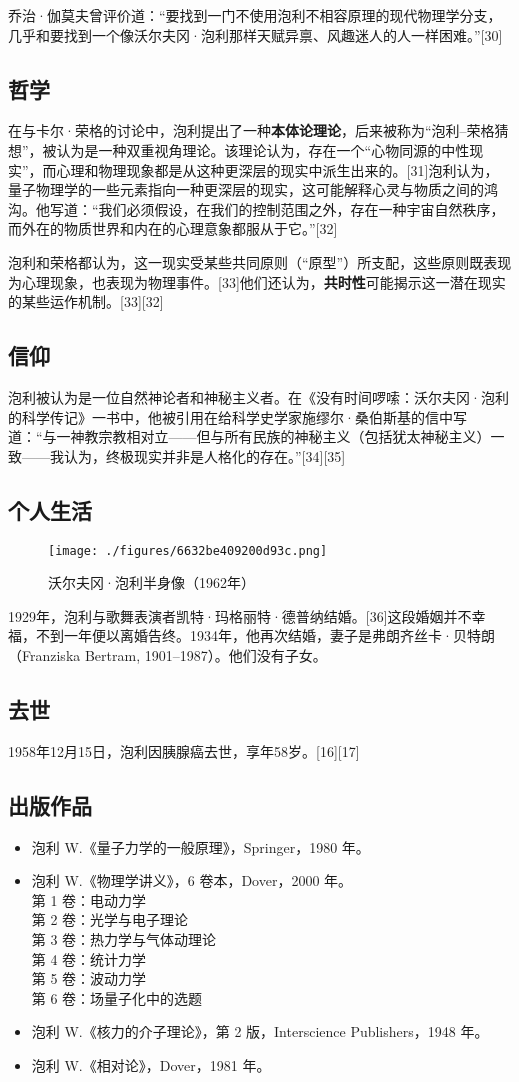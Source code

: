 乔治·伽莫夫曾评价道：“要找到一门不使用泡利不相容原理的现代物理学分支，几乎和要找到一个像沃尔夫冈·泡利那样天赋异禀、风趣迷人的人一样困难。”[30]
\subsection{哲学}  
在与卡尔·荣格的讨论中，泡利提出了一种\textbf{本体论理论}，后来被称为“泡利–荣格猜想”，被认为是一种双重视角理论。该理论认为，存在一个“心物同源的中性现实”，而心理和物理现象都是从这种更深层的现实中派生出来的。[31]泡利认为，量子物理学的一些元素指向一种更深层的现实，这可能解释心灵与物质之间的鸿沟。他写道：“我们必须假设，在我们的控制范围之外，存在一种宇宙自然秩序，而外在的物质世界和内在的心理意象都服从于它。”[32]  

泡利和荣格都认为，这一现实受某些共同原则（“原型”）所支配，这些原则既表现为心理现象，也表现为物理事件。[33]他们还认为，\textbf{共时性}可能揭示这一潜在现实的某些运作机制。[33][32]  
\subsection{信仰} 
泡利被认为是一位自然神论者和神秘主义者。在《没有时间啰嗦：沃尔夫冈·泡利的科学传记》一书中，他被引用在给科学史学家施缪尔·桑伯斯基的信中写道：“与一神教宗教相对立——但与所有民族的神秘主义（包括犹太神秘主义）一致——我认为，终极现实并非是人格化的存在。”[34][35]
\subsection{个人生活}
\begin{figure}[ht]
\centering
\texttt{[image: ./figures/6632be409200d93c.png]}
\caption{沃尔夫冈·泡利半身像（1962年）} \label{fig_Pauli2_5}
\end{figure}
1929年，泡利与歌舞表演者凯特·玛格丽特·德普纳结婚。[36]这段婚姻并不幸福，不到一年便以离婚告终。1934年，他再次结婚，妻子是弗朗齐丝卡·贝特朗（Franziska Bertram, 1901–1987）。他们没有子女。  
\subsection{去世}  
1958年12月15日，泡利因胰腺癌去世，享年58岁。[16][17]
\subsection{出版作品}  
\begin{itemize}
\item 泡利 W.《量子力学的一般原理》，Springer，1980 年。  
\item 泡利 W.《物理学讲义》，6 卷本，Dover，2000 年。\\  
  第 1 卷：电动力学\\  
  第 2 卷：光学与电子理论\\  
  第 3 卷：热力学与气体动理论\\  
  第 4 卷：统计力学 \\
  第 5 卷：波动力学\\
  第 6 卷：场量子化中的选题 
\item 泡利 W.《核力的介子理论》，第 2 版，Interscience Publishers，1948 年。  
\item 泡利 W.《相对论》，Dover，1981 年。  
\end{itemize}

